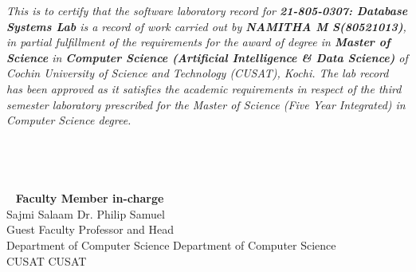 \documentclass[a4paper,12pt]{report}
\begin{document}
	\textit{This is to certify that the software laboratory record for \textbf{21-805-0307: Database Systems Lab} is a record of work carried out by \textbf{NAMITHA M S(80521013)}, in partial fulfillment of the requirements for the award of degree in \textbf{Master of Science\small{}} \normalsize in \textbf{Computer Science (Artificial Intelligence \& Data Science)} of Cochin University of Science and Technology (CUSAT), Kochi. The lab record has been approved as it satisfies the academic requirements in respect of the third semester laboratory prescribed for the Master of Science (Five Year Integrated) in Computer Science degree.\\\\\\\\\\\ }
	\vspace{50pt}
	\small\textbf{Faculty Member in-charge\\}
	\vspace{0pt}
	Sajmi Salaam \hspace{275pt} Dr. Philip Samuel \\
	Guest Faculty \hspace{267 pt} Professor and Head\\
	Department of Computer Science \hspace{106pt} Department of Computer Science \\
	CUSAT \hspace{352pt} CUSAT
	

	\newpage
	
    \setcounter{page}{1}


	
	\pagestyle{fancy}
	\fancyfoot[C]{}
		
\end{document}
